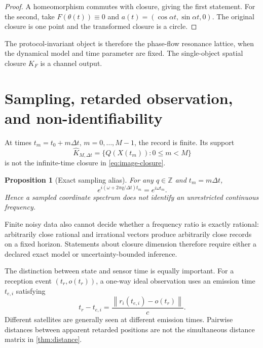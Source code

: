 \documentclass[11pt,a4paper]{article}
\theoremstyle{definition}
\theoremstyle{plain}
\newtheorem{proposition}[definition]{Proposition}
\theoremstyle{remark}
\newcommand{\Z}{\mathbb{Z}}
\newcommand{\norm}[1]{\left\lVert #1\right\rVert}
\begin{document}
\begin{proof}
A homeomorphism commutes with closure, giving the first statement.
For the second, take \(F(\theta(t))\equiv0\) and
\(a(t)=(\cos\alpha t,\sin\alpha t,0)\).  The original closure is one
point and the transformed closure is a circle.
\end{proof}

The protocol-invariant object is therefore the phase-flow resonance
lattice, when the dynamical model and time parameter are fixed.  The
single-object spatial closure \(K_F\) is a channel output.

\section{Sampling, retarded observation, and non-identifiability}

At times \(t_m=t_0+m\Delta t\), \(m=0,\ldots,M-1\), the record is
finite.  Its support
\begin{equation}\label{eq:empirical-support}
\widehat K_{M,\Delta t}
=\{Q(X(t_m)):0\le m<M\}
\end{equation}
is not the infinite-time closure in \cref{eq:image-closure}.

\begin{proposition}[Exact sampling alias]
\label{prop:alias}
For any \(q\in\Z\) and \(t_m=m\Delta t\),
\begin{equation}\label{eq:alias}
e^{i(\omega+2\pi q/\Delta t)t_m}
=e^{i\omega t_m}.
\end{equation}
Hence a sampled coordinate spectrum does not identify an unrestricted
continuous frequency.
\end{proposition}

Finite noisy data also cannot decide whether a frequency ratio is
exactly rational: arbitrarily close rational and irrational vectors
produce arbitrarily close records on a fixed horizon.  Statements
about closure dimension therefore require either a declared exact
model or uncertainty-bounded inference.

The distinction between state and sensor time is equally important.
For a reception event \((t_r,o(t_r))\), a one-way ideal observation
uses an emission time \(t_{e,i}\) satisfying
\begin{equation}\label{eq:light-time}
t_r-t_{e,i}
=\frac{\norm{r_i(t_{e,i})-o(t_r)}}{c}.
\end{equation}
Different satellites are generally seen at different emission times.
Pairwise distances between apparent retarded positions are not the
simultaneous distance matrix in \cref{thm:distance}.
\end{document}
